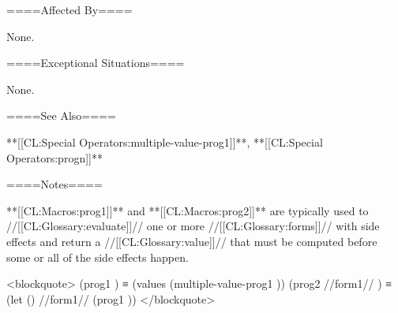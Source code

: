 ====Affected By====

None.

====Exceptional Situations====

None.

====See Also====

**[[CL:Special Operators:multiple-value-prog1]]**, **[[CL:Special Operators:progn]]**

====Notes====

**[[CL:Macros:prog1]]** and **[[CL:Macros:prog2]]** are typically used to //[[CL:Glossary:evaluate]]// one or more //[[CL:Glossary:forms]]// with side effects and return a //[[CL:Glossary:value]]// that must be computed before some or all of the side effects happen.

<blockquote> (prog1 ) ≡ (values (multiple-value-prog1 )) (prog2 //form1// ) ≡ (let () //form1// (prog1 )) </blockquote>

